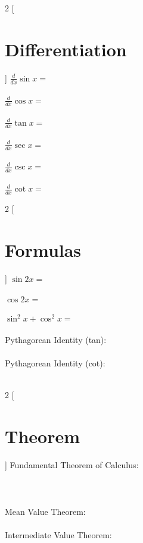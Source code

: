 \documentclass{exam}
\begin{document}
\begin{multicols}{2}
[
\section{Differentiation}
]
\noindent
$\frac{d}{dx}\sin x = $ \\\\
$\frac{d}{dx}\cos x = $ \\\\
$\frac{d}{dx}\tan x = $ \\\\
$\frac{d}{dx}\sec x = $ \\\\
$\frac{d}{dx}\csc x = $ \\\\
$\frac{d}{dx}\cot x = $ \\
\end{multicols}
\begin{multicols}{2}
[
\section{Formulas}
]
$\sin 2x = $\\\\
$\cos 2x = $\\\\
$\sin ^2x + \cos^2x =$\\\\
Pythagorean Identity (tan): \\\\
Pythagorean Identity (cot): \\\\
\end{multicols}
\begin{multicols}{2}
[\section {Theorem}]
Fundamental Theorem of Calculus:\\\\\\\\
Mean Value Theorem:\\\\
Intermediate Value Theorem: \\\\\\\\
\end{multicols}
\end{document}
